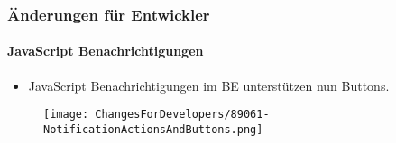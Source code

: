%
%
%
%
%
%
%


\begin{frame}[fragile]
	\frametitle{Änderungen für Entwickler}
	\framesubtitle{JavaScript Benachrichtigungen}

	\begin{itemize}
		\item JavaScript Benachrichtigungen im BE unterstützen nun Buttons.
	\end{itemize}

	\begin{figure}
		\texttt{[image: ChangesForDevelopers/89061-NotificationActionsAndButtons.png]}
	\end{figure}

\end{frame}


